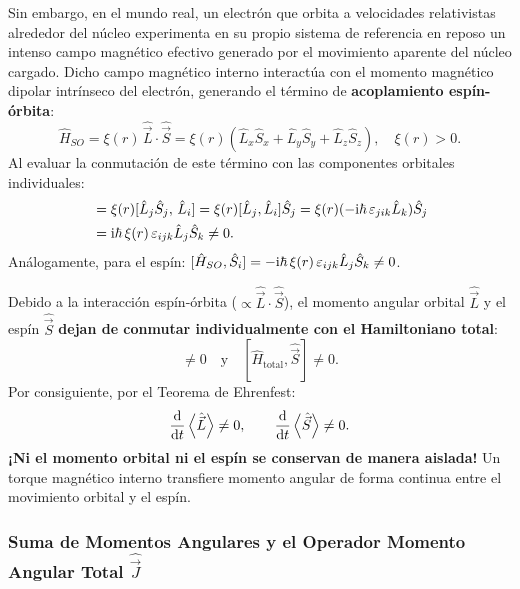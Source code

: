 Sin embargo, en el mundo real, un electrón que orbita a velocidades relativistas alrededor del núcleo experimenta en su propio sistema de referencia en reposo un intenso campo magnético efectivo generado por el movimiento aparente del núcleo cargado. Dicho campo magnético interno interactúa con el momento magnético dipolar intrínseco del electrón, generando el término de \textbf{acoplamiento espín-órbita}:
\begin{equation}
    \hat{H}_{SO} = \xi(r)\,\hat{\vec{L}}\cdot\hat{\vec{S}} = \xi(r)\left( \hat{L}_x\hat{S}_x + \hat{L}_y\hat{S}_y + \hat{L}_z\hat{S}_z \right), \quad \xi(r) > 0.
    \label{eq:h_so_def}
\end{equation}
Al evaluar la conmutación de este término con las componentes orbitales individuales:
\begin{align}
    [\hat{H}_{SO}, \hat{L}_i] &= \xi(r)[\hat{L}_j\hat{S}_j, \, \hat{L}_i] = \xi(r)[\hat{L}_j, \hat{L}_i]\hat{S}_j = \xi(r)(-\iu\hbar\,\varepsilon_{jik}\hat{L}_k)\hat{S}_j \nonumber\\
    &= \iu\hbar\,\xi(r)\,\varepsilon_{ijk}\hat{L}_j\hat{S}_k \neq 0.
\end{align}
Análogamente, para el espín: $[\hat{H}_{SO}, \hat{S}_i] = -\mathrm{i}\hbar\,\xi(r)\,\varepsilon_{ijk}\hat{L}_j\hat{S}_k \neq 0$.

\begin{alertabox}
    Debido a la interacción espín-órbita ($\propto \hat{\vec{L}}\cdot\hat{\vec{S}}$), el momento angular orbital $\hat{\vec{L}}$ y el espín $\hat{\vec{S}}$ \textbf{dejan de conmutar individualmente con el Hamiltoniano total}:
    \begin{equation}
        [\hat{H}_{\text{total}}, \hat{\vec{L}}] \neq 0 \quad \text{y} \quad [\hat{H}_{\text{total}}, \hat{\vec{S}}] \neq 0.
    \end{equation}
    Por consiguiente, por el Teorema de Ehrenfest:
    \begin{equation}
        \frac{\mathrm{d}}{\mathrm{d} t}\left\langle \hat{\vec{L}} \right\rangle \neq 0, \qquad \frac{\mathrm{d}}{\mathrm{d} t}\left\langle \hat{\vec{S}} \right\rangle \neq 0.
    \end{equation}
    \textbf{¡Ni el momento orbital ni el espín se conservan de manera aislada!} Un torque magnético interno transfiere momento angular de forma continua entre el movimiento orbital y el espín.
\end{alertabox}

\subsubsection{Suma de Momentos Angulares y el Operador Momento Angular Total $\hat{\vec{J}}$}

